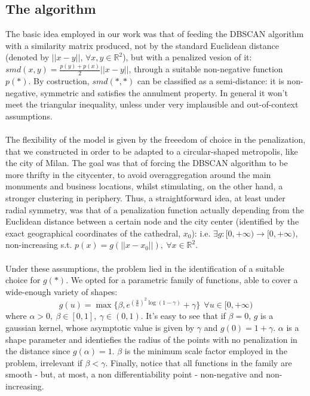 \documentclass[11pt,twoside]{report}
\begin{document}
\subsection{The algorithm}
The basic idea employed in our work was that of feeding the DBSCAN algorithm with a similarity matrix produced, not by the standard Euclidean distance (denoted by $ ||x-y|| $, $ \forall x, y \in \mathbb{R}^2 $), but with a penalized vesion of it: $ smd(x,y) = \frac{p(y)+p(x)}{2}||x-y|| $, through a suitable non-negative function $ p(*) $. By costruction, $ smd(*,*) $ can be classified as a semi-distance: it is non-negative, symmetric and satisfies the annulment property. In general it won't meet the triangular inequality, unless under very implausible and out-of-context assumptions.\\
\\
The flexibility of the model is given by the freeedom of choice in the penalization, that we constructed in order to be adapted to a circular-shaped metropolis, like the city of Milan. The goal was that of forcing the DBSCAN algorithm to be more thrifty in the citycenter, to avoid overaggregation around the main monuments and business locations, whilst stimulating, on the other hand, a stronger clustering in periphery. Thus, a straightforward idea, at least under radial symmetry,  was that of a penalization function actually depending from the Euclidean distance between a certain node and the city center (identified by the exact geographical coordinates of the cathedral, $ x_0 $): i.e. $\exists g:[0,+\infty)\rightarrow[0,+\infty)$, non-increasing s.t. $p(x) = g(||x-x_0||),\ \forall x \in \mathbb{R}^2$.\\
\\
Under these assumptions, the problem lied in the identification of a suitable choice for $ g(*) $. We opted for a parametric family of functions, able to cover a wide-enough variety of shapes:
\begin{equation}
 g(u) = \max\{\beta, e^{(\frac{u}{\alpha})^2\log{(1-\gamma)}}+\gamma\}\ \ \forall u \in [0,+\infty)
\end{equation}
where $ \alpha>0,\ \beta\in[0,1],\ \gamma \in (0,1) $. It's easy to see that if $ \beta=0 $, $ g $ is a gaussian kernel, whose asymptotic value is given by $ \gamma $ and $ g(0)=1+\gamma $. $ \alpha $ is a shape parameter and identiefies the radius of the points with no penalization in the distance since $ g(\alpha)=1 $. $ \beta $ is the minimum scale factor employed in the problem, irrelevant if $ \beta<\gamma $. Finally, notice that all functions in the family are smooth - but, at most, a non differentiability point - non-negative and non-increasing.\\
\end{document}
